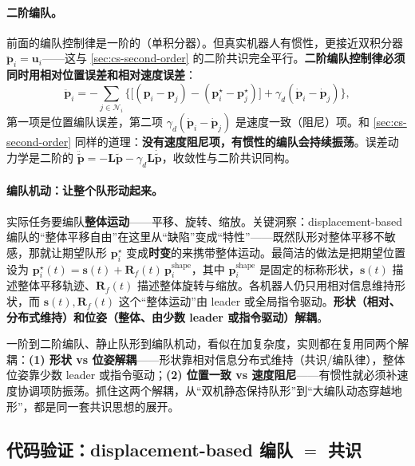 \paragraph{二阶编队。}
前面的编队控制律是一阶的（单积分器）。但真实机器人有惯性，更接近双积分器 $\ddot{\mathbf{p}}_i=\mathbf{u}_i$——这与 \cref{sec:cs-second-order} 的二阶共识完全平行。\textbf{二阶编队控制律必须同时用相对位置误差和相对速度误差}：
\begin{equation}
  \ddot{\mathbf{p}}_i=-\sum_{j\in\mathcal{N}_i}\Big\{\big[(\mathbf{p}_i-\mathbf{p}_j)-(\mathbf{p}_i^\star-\mathbf{p}_j^\star)\big]+\gamma_d(\dot{\mathbf{p}}_i-\dot{\mathbf{p}}_j)\Big\},
  \label{eq:cs-form-second}
\end{equation}
第一项是位置编队误差，第二项 $\gamma_d(\dot{\mathbf{p}}_i-\dot{\mathbf{p}}_j)$ 是速度一致（阻尼）项。和 \cref{sec:cs-second-order} 同样的道理：\textbf{没有速度阻尼项，有惯性的编队会持续振荡}。误差动力学是二阶的 $\ddot{\tilde{\mathbf{p}}}=-\mathbf{L}\tilde{\mathbf{p}}-\gamma_d\mathbf{L}\dot{\tilde{\mathbf{p}}}$，收敛性与二阶共识同构。

\paragraph{编队机动：让整个队形动起来。}
实际任务要编队\textbf{整体运动}——平移、旋转、缩放。关键洞察：displacement-based 编队的“整体平移自由”在这里从“缺陷”变成“特性”——既然队形对整体平移不敏感，那就让期望队形 $\mathbf{p}_i^\star$ 变成\textbf{时变}的来携带整体运动。最简洁的做法是把期望位置设为 $\mathbf{p}_i^\star(t)=\mathbf{s}(t)+\mathbf{R}_f(t)\,\mathbf{p}_i^{\text{shape}}$，其中 $\mathbf{p}_i^{\text{shape}}$ 是固定的标称形状，$\mathbf{s}(t)$ 描述整体平移轨迹、$\mathbf{R}_f(t)$ 描述整体旋转与缩放。各机器人仍只用相对信息维持形状，而 $\mathbf{s}(t),\mathbf{R}_f(t)$ 这个“整体运动”由 leader 或全局指令驱动。\textbf{形状（相对、分布式维持）和位姿（整体、由少数 leader 或指令驱动）解耦}。

\begin{insight}[编队的两个解耦]\label{ins:cs-form-decouple}
一阶到二阶编队、静止队形到编队机动，看似在加复杂度，实则都在复用同两个解耦：\textbf{(1) 形状 vs 位姿解耦}——形状靠相对信息分布式维持（共识/编队律），整体位姿靠少数 leader 或指令驱动；\textbf{(2) 位置一致 vs 速度阻尼}——有惯性就必须补速度协调项防振荡。抓住这两个解耦，从“双机静态保持队形”到“大编队动态穿越地形”，都是同一套共识思想的展开。
\end{insight}

\subsection{代码验证：displacement-based 编队 \texorpdfstring{$=$}{=} 共识}
\label{sec:cs-form-code}

